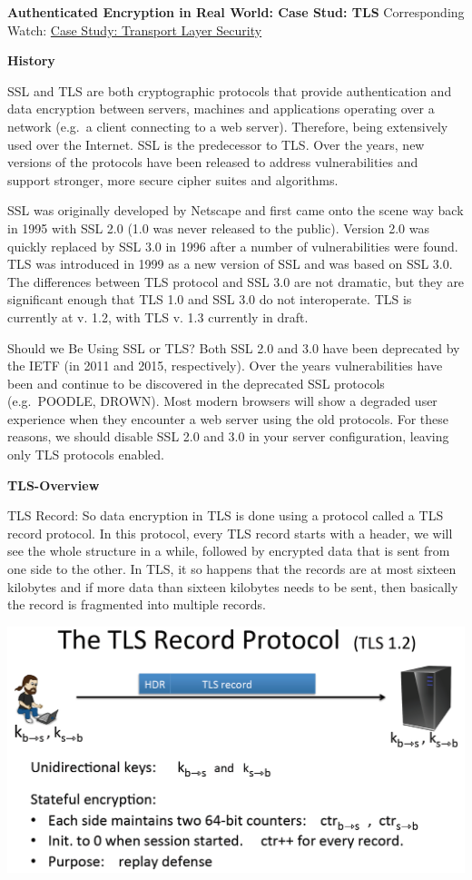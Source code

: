 \documentclass[11pt]{article}
\makeatletter
\def\maxwidth{\ifdim\Gin@nat@width>\linewidth\linewidth
    \else\Gin@nat@width\fi}
\let\Oldincludegraphics\includegraphics
\renewcommand{\includegraphics}[1]{\Oldincludegraphics[width=.8\maxwidth]{#1}}
\makeatother
\begin{document}
\textbf{Authenticated Encryption in Real World: Case Stud: TLS}
Corresponding Watch:
\href{https://www.coursera.org/learn/crypto/lecture/WZUsh/case-study-tls-1-2}{Case
Study: Transport Layer Security}

\textbf{History}

SSL and TLS are both cryptographic protocols that provide authentication
and data encryption between servers, machines and applications operating
over a network (e.g.~a client connecting to a web server). Therefore,
being extensively used over the Internet. SSL is the predecessor to TLS.
Over the years, new versions of the protocols have been released to
address vulnerabilities and support stronger, more secure cipher suites
and algorithms.

SSL was originally developed by Netscape and first came onto the scene
way back in 1995 with SSL 2.0 (1.0 was never released to the public).
Version 2.0 was quickly replaced by SSL 3.0 in 1996 after a number of
vulnerabilities were found. TLS was introduced in 1999 as a new version
of SSL and was based on SSL 3.0. The differences between TLS protocol
and SSL 3.0 are not dramatic, but they are significant enough that TLS
1.0 and SSL 3.0 do not interoperate. TLS is currently at v. 1.2, with
TLS v. 1.3 currently in draft.

Should we Be Using SSL or TLS? Both SSL 2.0 and 3.0 have been deprecated
by the IETF (in 2011 and 2015, respectively). Over the years
vulnerabilities have been and continue to be discovered in the
deprecated SSL protocols (e.g.~POODLE, DROWN). Most modern browsers will
show a degraded user experience when they encounter a web server using
the old protocols. For these reasons, we should disable SSL 2.0 and 3.0
in your server configuration, leaving only TLS protocols enabled.

\textbf{TLS-Overview}

TLS Record: So data encryption in TLS is done using a protocol called a
TLS record protocol. In this protocol, every TLS record starts with a
header, we will see the whole structure in a while, followed by
encrypted data that is sent from one side to the other. In TLS, it so
happens that the records are at most sixteen kilobytes and if more data
than sixteen kilobytes needs to be sent, then basically the record is
fragmented into multiple records.

\includegraphics{./Images/TLSRecordProto.png}
\end{document}
